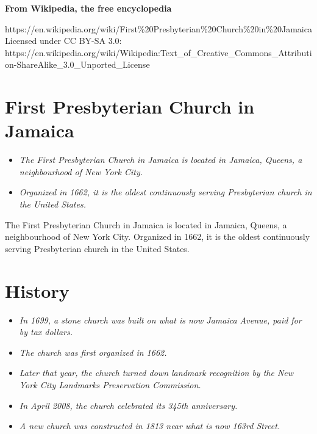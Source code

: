 \textbf{From Wikipedia, the free encyclopedia}

https://en.wikipedia.org/wiki/First\%20Presbyterian\%20Church\%20in\%20Jamaica\\
Licensed under CC BY-SA 3.0:\\
https://en.wikipedia.org/wiki/Wikipedia:Text\_of\_Creative\_Commons\_Attribution-ShareAlike\_3.0\_Unported\_License

\section{First Presbyterian Church in
Jamaica}\label{first-presbyterian-church-in-jamaica}

\begin{itemize}
\item
  \emph{The First Presbyterian Church in Jamaica is located in Jamaica,
  Queens, a neighbourhood of New York City.}
\item
  \emph{Organized in 1662, it is the oldest continuously serving
  Presbyterian church in the United States.}
\end{itemize}

The First Presbyterian Church in Jamaica is located in Jamaica, Queens,
a neighbourhood of New York City. Organized in 1662, it is the oldest
continuously serving Presbyterian church in the United States.

\section{History}\label{history}

\begin{itemize}
\item
  \emph{In 1699, a stone church was built on what is now Jamaica Avenue,
  paid for by tax dollars.}
\item
  \emph{The church was first organized in 1662.}
\item
  \emph{Later that year, the church turned down landmark recognition by
  the New York City Landmarks Preservation Commission.}
\item
  \emph{In April 2008, the church celebrated its 345th anniversary.}
\item
  \emph{A new church was constructed in 1813 near what is now 163rd
  Street.}
\end{itemize}

